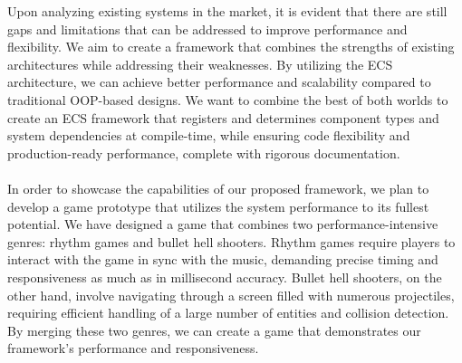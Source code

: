 Upon analyzing existing systems in the market, it is evident that there are still gaps and limitations 
that can be addressed to improve performance and flexibility.
We aim to create a framework that combines the strengths of existing architectures while addressing 
their weaknesses.
By utilizing the ECS architecture, we can achieve better performance and scalability compared to
traditional OOP-based designs.
We want to combine the best of both worlds \textemdash to create an ECS framework that registers and determines component types
and system dependencies at compile-time, while ensuring code flexibility and production-ready performance, complete
with rigorous documentation.
\\\\
In order to showcase the capabilities of our proposed framework, we plan to develop a game prototype that utilizes 
the system performance to its fullest potential.
We have designed a game that combines two performance-intensive genres: rhythm games and bullet hell shooters.
Rhythm games require players to interact with the game in sync with the music, demanding precise timing and 
responsiveness as much as in millisecond accuracy.
Bullet hell shooters, on the other hand, involve navigating through a screen filled with numerous projectiles, 
requiring efficient handling of a large number of entities and collision detection.
By merging these two genres, we can create a game that demonstrates our framework's performance and responsiveness.